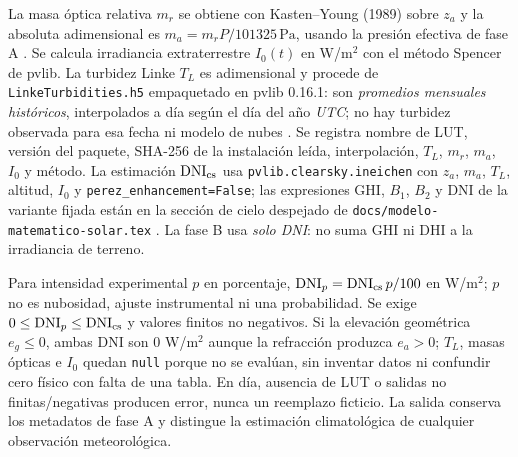\documentclass[11pt,a4paper]{article}
\begin{document}
La masa óptica relativa $m_r$ se obtiene con Kasten--Young (1989) sobre $z_a$ y la absoluta adimensional es $m_a=m_r P/101325\,\mathrm{Pa}$, usando la presión efectiva de fase A \cite{kastenyoung-solar}. Se calcula irradiancia extraterrestre $I_0(t)$ en W/m$^2$ con el método Spencer de pvlib. La turbidez Linke $T_L$ es adimensional y procede de \texttt{LinkeTurbidities.h5} empaquetado en pvlib 0.16.1: son \emph{promedios mensuales históricos}, interpolados a día según el día del año \emph{UTC}; no hay turbidez observada para esa fecha ni modelo de nubes \cite{pvlib-linke-solar}. Se registra nombre de LUT, versión del paquete, SHA-256 de la instalación leída, interpolación, $T_L$, $m_r$, $m_a$, $I_0$ y método. La estimación $\mathrm{DNI}_{\rm cs}$ usa \texttt{pvlib.clearsky.ineichen} con $z_a$, $m_a$, $T_L$, altitud, $I_0$ y \texttt{perez\_enhancement=False}; las expresiones GHI, $B_1$, $B_2$ y DNI de la variante fijada están en la sección de cielo despejado de \texttt{docs/modelo-matematico-solar.tex} \cite{ineichen-solar,pvlib-ineichen-solar}. La fase B usa \emph{solo DNI}: no suma GHI ni DHI a la irradiancia de terreno.

Para intensidad experimental $p$ en porcentaje, $\mathrm{DNI}_{p}=\mathrm{DNI}_{\rm cs}\,p/100$ en W/m$^2$; $p$ no es nubosidad, ajuste instrumental ni una probabilidad. Se exige $0\leq\mathrm{DNI}_{p}\leq\mathrm{DNI}_{\rm cs}$ y valores finitos no negativos. Si la elevación geométrica $e_g\leq0$, ambas DNI son $0$ W/m$^2$ aunque la refracción produzca $e_a>0$;  $T_L$, masas ópticas e $I_0$ quedan \texttt{null} porque no se evalúan, sin inventar datos ni confundir cero físico con falta de una tabla. En día, ausencia de LUT o salidas no finitas/negativas producen error, nunca un reemplazo ficticio. La salida conserva los metadatos de fase A y distingue la estimación climatológica de cualquier observación meteorológica.
\end{document}
